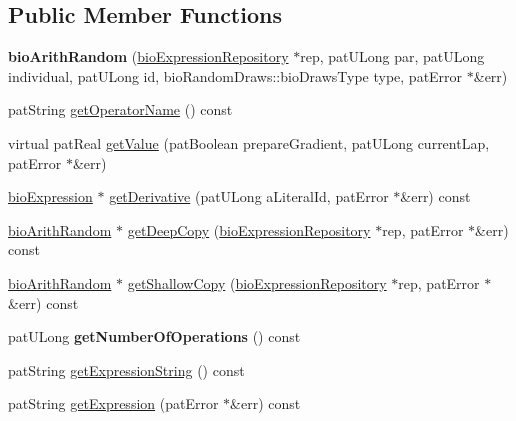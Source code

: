 \subsection*{Public Member Functions}
\begin{DoxyCompactItemize}
\item 
\mbox{\label{classbio_arith_random_a71bf8f6465482ac55bdaecf57091c09b}} 
{\bfseries bio\+Arith\+Random} (\hyperlink{classbio_expression_repository}{bio\+Expression\+Repository} $\ast$rep, pat\+U\+Long par, pat\+U\+Long individual, pat\+U\+Long id, bio\+Random\+Draws\+::bio\+Draws\+Type type, pat\+Error $\ast$\&err)
\item 
pat\+String \hyperlink{classbio_arith_random_a0f83701f05a22956b5c4fff431c40895}{get\+Operator\+Name} () const
\item 
virtual pat\+Real \hyperlink{classbio_arith_random_a57ed5e619ea85ce7a4ece51ce4e05983}{get\+Value} (pat\+Boolean prepare\+Gradient, pat\+U\+Long current\+Lap, pat\+Error $\ast$\&err)
\item 
\hyperlink{classbio_expression}{bio\+Expression} $\ast$ \hyperlink{classbio_arith_random_a20b4fe8de86bf00654a94b0d534e6743}{get\+Derivative} (pat\+U\+Long a\+Literal\+Id, pat\+Error $\ast$\&err) const
\item 
\hyperlink{classbio_arith_random}{bio\+Arith\+Random} $\ast$ \hyperlink{classbio_arith_random_a947f100ddb8037bf424d343faee56b83}{get\+Deep\+Copy} (\hyperlink{classbio_expression_repository}{bio\+Expression\+Repository} $\ast$rep, pat\+Error $\ast$\&err) const
\item 
\hyperlink{classbio_arith_random}{bio\+Arith\+Random} $\ast$ \hyperlink{classbio_arith_random_aef00154ab54de9ed4acd1cf45d9036ce}{get\+Shallow\+Copy} (\hyperlink{classbio_expression_repository}{bio\+Expression\+Repository} $\ast$rep, pat\+Error $\ast$\&err) const
\item 
\mbox{\label{classbio_arith_random_aeb2882becaab6950ee4582b750d80f35}} 
pat\+U\+Long {\bfseries get\+Number\+Of\+Operations} () const
\item 
pat\+String \hyperlink{classbio_arith_random_a9ba191f0138f188b1c70f568c5873434}{get\+Expression\+String} () const
\item 
pat\+String \hyperlink{classbio_arith_random_a54b48a4876469d44f324f73758ea1b6c}{get\+Expression} (pat\+Error $\ast$\&err) const
\item 
\mbox{\label{classbio_arith_random_a04107a0b2b42f92d6725c8871da676ca}} 

\end{DoxyCompactItemize}
